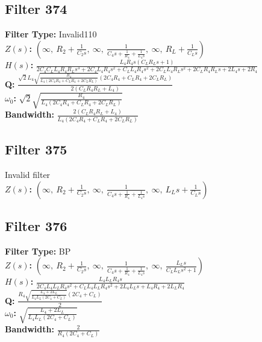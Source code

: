 \documentclass{article}
\begin{document}
\subsection*{Filter 374}
\textbf{Filter Type:} Invalid110 \\ 
\textbf{$Z(s)$:} $\left( \infty, \  R_{2} + \frac{1}{C_{2} s}, \  \infty, \  \frac{1}{C_{4} s + \frac{1}{R_{4}} + \frac{1}{L_{4} s}}, \  \infty, \  R_{L} + \frac{1}{C_{L} s}\right)$ \\ 
\textbf{$H(s)$:} $\frac{L_{4} R_{4} s \left(C_{L} R_{L} s + 1\right)}{2 C_{4} C_{L} L_{4} R_{4} R_{L} s^{3} + 2 C_{4} L_{4} R_{4} s^{2} + C_{L} L_{4} R_{4} s^{2} + 2 C_{L} L_{4} R_{L} s^{2} + 2 C_{L} R_{4} R_{L} s + 2 L_{4} s + 2 R_{4}}$ \\ 
\textbf{Q:} $\frac{\sqrt{2} L_{4} \sqrt{\frac{R_{4}}{L_{4} \left(2 C_{4} R_{4} + C_{L} R_{4} + 2 C_{L} R_{L}\right)}} \left(2 C_{4} R_{4} + C_{L} R_{4} + 2 C_{L} R_{L}\right)}{2 \left(C_{L} R_{4} R_{L} + L_{4}\right)}$ \\ 
\textbf{$\omega_0$:} $\sqrt{2} \sqrt{\frac{R_{4}}{L_{4} \left(2 C_{4} R_{4} + C_{L} R_{4} + 2 C_{L} R_{L}\right)}}$ \\ 
\textbf{Bandwidth:} $\frac{2 \left(C_{L} R_{4} R_{L} + L_{4}\right)}{L_{4} \left(2 C_{4} R_{4} + C_{L} R_{4} + 2 C_{L} R_{L}\right)}$ \\ 
\subsection*{Filter 375}
Invalid filter \\ 
\textbf{$Z(s)$:} $\left( \infty, \  R_{2} + \frac{1}{C_{2} s}, \  \infty, \  \frac{1}{C_{4} s + \frac{1}{R_{4}} + \frac{1}{L_{4} s}}, \  \infty, \  L_{L} s + \frac{1}{C_{L} s}\right)$ \\ 
\subsection*{Filter 376}
\textbf{Filter Type:} BP \\ 
\textbf{$Z(s)$:} $\left( \infty, \  R_{2} + \frac{1}{C_{2} s}, \  \infty, \  \frac{1}{C_{4} s + \frac{1}{R_{4}} + \frac{1}{L_{4} s}}, \  \infty, \  \frac{L_{L} s}{C_{L} L_{L} s^{2} + 1}\right)$ \\ 
\textbf{$H(s)$:} $\frac{L_{4} L_{L} R_{4} s}{2 C_{4} L_{4} L_{L} R_{4} s^{2} + C_{L} L_{4} L_{L} R_{4} s^{2} + 2 L_{4} L_{L} s + L_{4} R_{4} + 2 L_{L} R_{4}}$ \\ 
\textbf{Q:} $\frac{R_{4} \sqrt{\frac{L_{4} + 2 L_{L}}{L_{4} L_{L} \left(2 C_{4} + C_{L}\right)}} \left(2 C_{4} + C_{L}\right)}{2}$ \\ 
\textbf{$\omega_0$:} $\sqrt{\frac{L_{4} + 2 L_{L}}{L_{4} L_{L} \left(2 C_{4} + C_{L}\right)}}$ \\ 
\textbf{Bandwidth:} $\frac{2}{R_{4} \left(2 C_{4} + C_{L}\right)}$ \\ 
\end{document}
